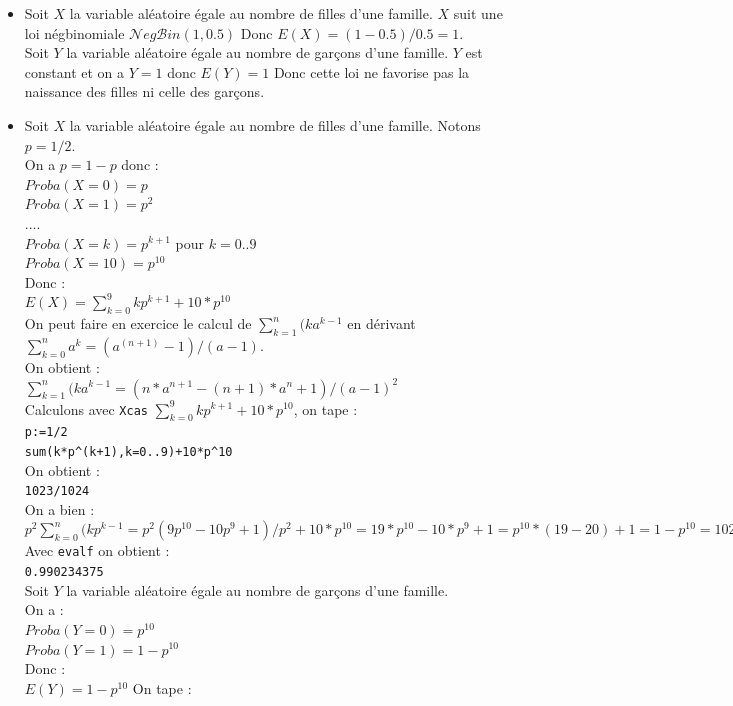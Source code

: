 \documentclass[a4paper,11pt]{book}
\begin{document}
\begin{itemize}
\item Soit $X$ la variable al\'eatoire \'egale au nombre de filles d'une 
famille. $X$ suit une loi n\'egbinomiale $\mathcal{N}eg\mathcal{B}in(1,0.5)$ 
Donc $E(X)=(1-0.5)/0.5=1$.\\
Soit $Y$ la variable al\'eatoire \'egale au nombre de 
gar\c{c}ons d'une famille. $Y$ est constant et on a $Y=1$ donc $E(Y)=1$
Donc cette loi ne favorise pas la naissance des filles ni celle des gar\c{c}ons.
\item Soit $X$ la variable al\'eatoire \'egale au nombre de filles d'une 
famille.  Notons $p=1/2$. \\
On a $p=1-p$ donc :\\
$Proba(X=0)=p$\\
$Proba(X=1)=p^2$\\
....\\
$Proba(X=k)=p^{k+1}$ pour $k=0..9$\\
$Proba(X=10)=p^{10}$\\
Donc :\\
$E(X)=\sum_{k=0}^9kp^{k+1}+10*p^{10}$\\
On peut faire en exercice le calcul de $\sum_{k=1}^n(ka^{k-1}$ en d\'erivant 
$\sum_{k=0}^na^k=(a^(n+1)-1)/(a-1)$.\\
On obtient :\\
$\sum_{k=1}^n(ka^{k-1}=(n*a^{n+1}-(n+1)*a^n+1)/(a-1)^2$\\
Calculons avec {\tt Xcas} $\sum_{k=0}^9kp^{k+1}+10*p^{10}$, on tape :\\
{\tt p:=1/2}\\
{\tt sum(k*p\verb|^|(k+1),k=0..9)+10*p\verb|^|10}\\
On obtient :\\
{\tt 1023/1024}\\
On a bien : \\
$p^2\sum_{k=0}^n(kp^{k-1}=p^2(9p^{10}-10p^9+1)/p^2+10*p^{10}=19*p^{10}-10*p^9+1=p^{10}*(19-20)+1=1-p^{10}=1023/1024$
Avec {\tt evalf} on obtient :\\
{\tt 0.990234375}\\
Soit $Y$ la variable al\'eatoire \'egale au nombre de 
gar\c{c}ons d'une famille.\\
On a :\\
$Proba(Y=0)=p^{10}$\\ 
$Proba(Y=1)=1-p^{10}$\\ 
Donc :\\
$E(Y)=1-p^{10}$
On tape :\\

\end{itemize}
\end{document}

